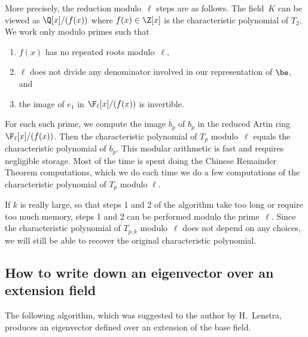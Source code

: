 \documentclass{report}
\begin{document}
More precisely, the reduction modulo~$\ell$ steps are as follows.
The field~$K$ can be viewed as $\Q[x]/(f(x))$ where $f(x)\in
\Z[x]$ is the characteristic polynomial of $T_2$.  We work only
modulo primes such that
\begin{enumerate}
\item $f(x)$ has no repeated roots modulo~$\ell$,%
\item $\ell$ does not divide any denominator involved in our
representation of $\be$, and%
\item the image of $e_1$ in $\F_\ell[x]/(f(x))$ is invertible.
\end{enumerate}
For each such prime, we compute the image $\overline{b}_p$ of
$b_p$ in the reduced Artin ring $\F_\ell[x]/(f(x))$.  Then the
characteristic polynomial of $T_p$ modulo~$\ell$ equals the
characteristic polynomial of $\overline{b}_p$.  This modular
arithmetic is fast and requires negligible storage.  Most of the
time is spent doing the Chinese Remainder Theorem computations,
which we do each time we do a few computations of the
characteristic polynomial of $T_p$ modulo $\ell$.


\begin{remark}
If $k$ is really large, so that steps 1 and 2 of the algorithm
take too long or require too much memory, steps 1 and 2 can be
performed modulo the prime~$\ell$.  Since the characteristic
polynomial of $T_{p,k}$ modulo~$\ell$ does not depend on any
choices, we will still be able to recover the original
characteristic polynomial.
\end{remark}

\subsection{How to write down an eigenvector over an extension field}
The following algorithm, which was suggested to the author
by H.~Lenstra, produces an eigenvector defined over an
extension of the base field.
\end{document}
